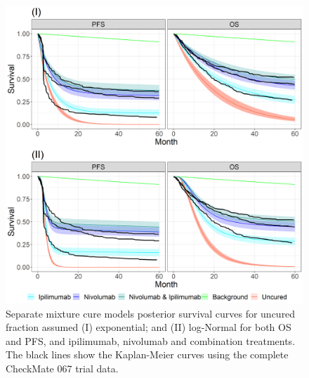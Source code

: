 \documentclass[AMA,STIX1COL]{WileyNJD-v2}
\begin{document}




\begin{figure}
\centering
\includegraphics[width=0.7\linewidth]{plot_S_exp_lognormal_grid_cf_separate.png}
\caption{\label{fig:S_exp_lnorm_cf_sep} Separate mixture cure models posterior survival curves for uncured fraction assumed (I) exponential; and (II) log-Normal for both OS and PFS, and ipilimumab, nivolumab and combination treatments. The black lines show the Kaplan-Meier curves using the complete CheckMate 067 trial data.}
\end{figure}
\end{document}
